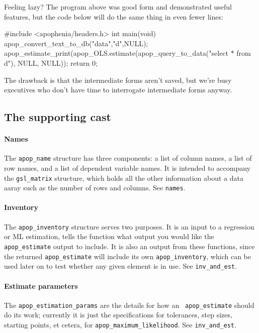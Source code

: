 Feeling lazy? The program above was good form and demonstrated useful
features, but the code below will do the same thing in even fewer lines:

#include <apophenia/headers.h>
int main(void){
    apop_convert_text_to_db("data","d",NULL);
    apop_estimate_print(apop_OLS.estimate(apop_query_to_data("select * from d"), NULL, NULL));
    return 0; }

The drawback is that the intermediate forms aren't saved, but we're busy
executives who don't have time to interrogate intermediate forms anyway.

\subsection{The supporting cast}
\paragraph{Names}
The {\tt apop\_name} structure has three components: a list of column
names, a list of row names, and a list of dependent variable names. It
is intended to accompany the {\tt gsl\_matrix} structure, which holds
all the other information about a data aaray such as the number of rows
and columns.  See {\tt names}.

\paragraph{Inventory}
The {\tt apop\_inventory} structure serves two purposes. It is an input
to a regression or ML estimation, tells the function what output you
would like the {\tt apop\_\-estimate}  output to include. It is also an
output from these functions, since the returned {\tt apop\_\-estimate}
will include its own {\tt apop\_\-in\-ventory},  which can be used later on
to test whether any given element is in use. See {\tt inv\_and\_est}.

\paragraph{Estimate parameters}
The {\tt apop\_estimation\_params} are the details for how an {\tt
apop\_estimate} should do its work; currently it is just the specifications
for tolerances, step sizes, starting points, et cetera, for {\tt apop\_max\-i\-mum\_like\-li\-hood}.
 See {\tt inv\_and\_est}.
